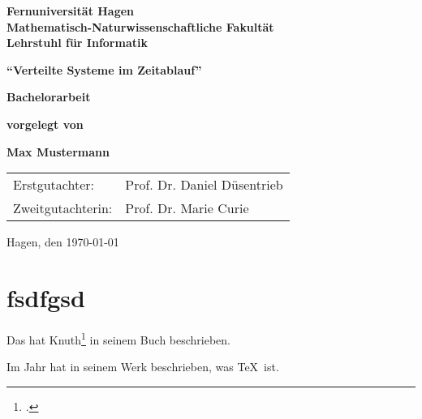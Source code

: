 \documentclass[12pt,ngerman,parskip=half]{scrbook}
\begin{document}
\begin{titlepage}
{\large\bfseries Fernuniversität Hagen \\
Mathematisch-Naturwissenschaftliche Fakultät \\
Lehrstuhl für Informatik}

\vspace*{5cm}
\begin{center}
{\LARGE\bfseries\enquote{Verteilte Systeme im Zeitablauf}}
\end{center}

\vspace*{1cm}
\begin{center}
{\Large\bfseries Bachelorarbeit}
\end{center}


\begin{center}
{\large\bfseries  vorgelegt von }
\end{center}

\begin{center}
{\Large\bfseries Max Mustermann}
\end{center}


\vfill
\begin{tabular}{ll}
Erstgutachter: & Prof. Dr. Daniel Düsentrieb \\
Zweitgutachterin: & Prof. Dr. Marie Curie \\
\end{tabular}

\hfill Hagen, den \today
\end{titlepage}



\tableofcontents

\listoffigures

\chapter{fsdfgsd}

\cite{knuth:1984}

\cite{ziegenhagen:2017}

\parencite{knuth:1984}

\cite{ziegenhagen:2017}

\cite{Bohmann:2017}

Das hat Knuth\footcite{knuth:1984} in seinem Buch beschrieben.

Im Jahr \citeyear{knuth:1984} hat \citeauthor{knuth:1984} in seinem Werk  beschrieben, was \TeX\ ist.









\blindtext[100]

\printbibliography

\printbibliography[title={Artikel},type=article]

\printbibliography[title={Bücher},type=book]
\end{document}
